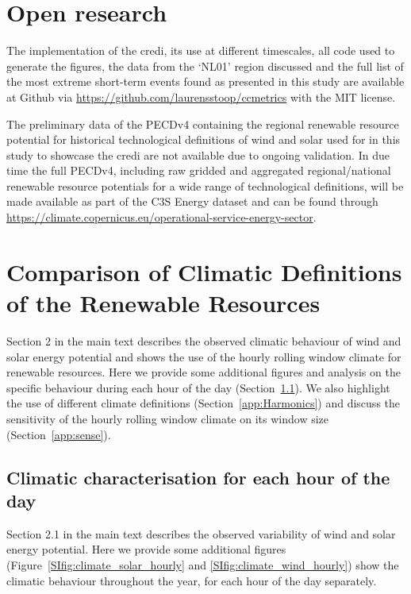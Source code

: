 \documentclass[a4paper,11pt]{extarticle}
\newcommand{\credi}[0]{{\sc credi}}
\begin{document}
\section*{Open research} 
The implementation of the \credi{}, its use at different timescales, all code used to generate the figures, the data from the `NL01' region discussed and the full list of the most extreme short-term events found as presented in this study are available at Github via \url{https://github.com/laurensstoop/ccmetrics} with the MIT license. 

The preliminary data of the PECDv4 containing the regional renewable resource potential for historical technological definitions of wind and solar used for in this study to showcase the \credi{} are not available due to ongoing validation. 
In due time the full PECDv4, including raw gridded and aggregated regional/national renewable resource potentials for a wide range of technological definitions, will be made available as part of the C3S Energy dataset and can be found through \url{https://climate.copernicus.eu/operational-service-energy-sector}.

\clearpage
\printbibliography 



\clearpage
\appendix
\beginsupplement

\section{Comparison of Climatic Definitions of the Renewable Resources}
Section 2 in the main text describes the observed climatic behaviour of wind and solar energy potential and shows the use of the hourly rolling window climate for renewable resources. 
Here we provide some additional figures and analysis on the specific behaviour during each hour of the day (Section~\ref{app:clima_hourly}). 
We also highlight the use of different climate definitions (Section~\ref{app:Harmonics}) and discuss the sensitivity of the hourly rolling window climate on its window size (Section~\ref{app:sense}).

\subsection{Climatic characterisation for each hour of the day }\label{app:clima_hourly}
Section 2.1 in the main text describes the observed variability of wind and solar energy potential. 
Here we provide some additional figures (Figure~\ref{SIfig:climate_solar_hourly} and \ref{SIfig:climate_wind_hourly}) show the climatic behaviour throughout the year, for each hour of the day separately. 
\end{document}
